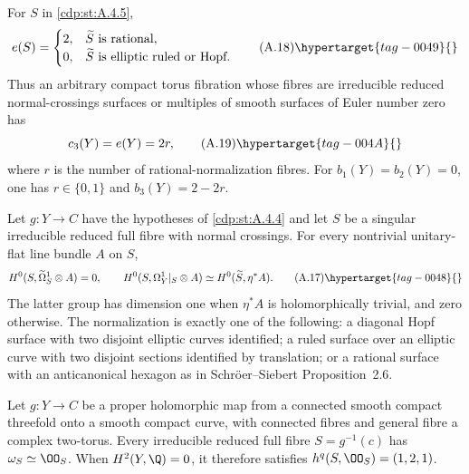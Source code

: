 
\begin{proposition}\hypertarget{tag-01AV}{}\label{cdp:st:A.4.6}


For $S$ in \ref{cdp:st:A.4.5},
\[
e(S)=\begin{cases}
2,&\widetilde S\text{ is rational},\\
0,&\widetilde S\text{ is elliptic ruled or Hopf}.
\end{cases}
\tag{A.18}\hypertarget{tag-0049}{}\label{cdp:eq:A.18}
\]
Thus an arbitrary compact torus fibration whose fibres are irreducible reduced normal-crossings surfaces or multiples of smooth surfaces of Euler number zero has
\[
c_3(Y)=e(Y)=2r,
\tag{A.19}\hypertarget{tag-004A}{}\label{cdp:eq:A.19}
\]
where $r$ is the number of rational-normalization fibres. For $b_1(Y)=b_2(Y)=0$, one has $r\in\{0,1\}$ and $b_3(Y)=2-2r$.
\end{proposition}

\begin{proposition}\hypertarget{tag-01AU}{}\label{cdp:st:A.4.5}


Let $g:Y\to C$ have the hypotheses of \ref{cdp:st:A.4.4} and let $S$ be a singular irreducible reduced full fibre with normal crossings. For every nontrivial unitary-flat line bundle $A$ on $S$,
\[
H^0(S,\widetilde\Omega_S^1\otimes A)=0,
\qquad
H^0(S,\Omega_Y^1|_S\otimes A)
 \simeq H^0(\widetilde S,\eta^*A).
\tag{A.17}\hypertarget{tag-0048}{}\label{cdp:eq:A.17}
\]
The latter group has dimension one when $\eta^*A$ is holomorphically trivial, and zero otherwise. The normalization is exactly one of the following: a diagonal Hopf surface with two disjoint elliptic curves identified; a ruled surface over an elliptic curve with two disjoint sections identified by translation; or a rational surface with an anticanonical hexagon as in Schr\"oer--Siebert Proposition~2.6.
\end{proposition}

\begin{proposition}\hypertarget{tag-01AT}{}\label{cdp:st:A.4.4}


Let $g:Y\to C$ be a proper holomorphic map from a connected smooth compact threefold onto a smooth compact curve, with connected fibres and general fibre a complex two-torus. Every irreducible reduced full fibre $S=g^{-1}(c)$ has $\omega_S\simeq\OO_S$. When $H^2(Y,\Q)=0$, it therefore satisfies $h^q(S,\OO_S)=(1,2,1)$.
\end{proposition}

